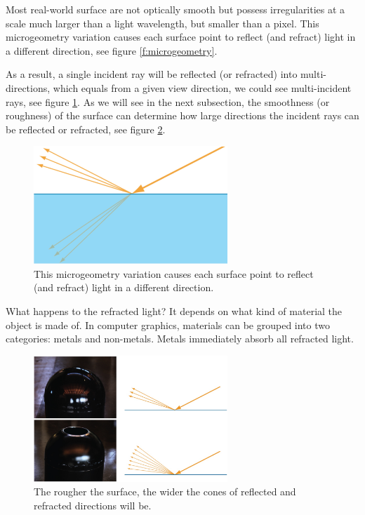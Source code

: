 Most real-world surface are not optically smooth but possess irregularities at a scale much larger than a light wavelength, but smaller than a pixel. This microgeometry variation causes each surface point to reflect (and refract) light in a different direction, see figure \ref{f:microgeometry}.

As a result, a single incident ray will be reflected (or refracted) into multi-directions, which equals from a given view direction, we could see multi-incident rays, see figure \ref{f:multi-rays}. As we will see in the next subsection, the smoothness (or roughness) of the surface can determine how large directions the incident rays can be reflected or refracted, see figure \ref{f:roughness}.

\begin{figure}
\sidecaption
	\includegraphics[width=0.65\textwidth]{graphics/gi/ray-optics-4}
	\caption{This microgeometry variation causes each surface point to reflect (and refract) light in a different direction.}
	\label{f:multi-rays}
\end{figure}

What happens to the refracted light? It depends on what kind of material the object is made of. In computer graphics, materials can be grouped into two categories: metals and non-metals. Metals immediately absorb all refracted light.

\begin{figure}
\sidecaption
	\includegraphics[width=0.65\textwidth]{graphics/gi/ray-optics-2}
	\caption{The rougher the surface, the wider the cones of reflected and refracted directions will be.}
	\label{f:roughness}
\end{figure}

